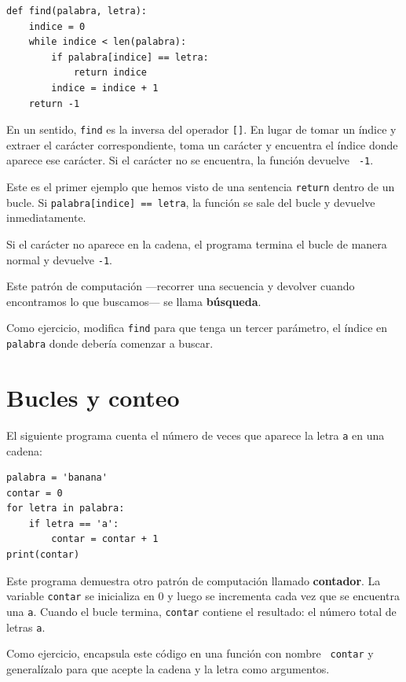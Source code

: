 \documentclass[10pt]{book}
\begin{document}
\begin{verbatim}
def find(palabra, letra):
    indice = 0
    while indice < len(palabra):
        if palabra[indice] == letra:
            return indice
        indice = indice + 1
    return -1
\end{verbatim}
%
En un sentido, {\tt find} es la inversa del operador {\tt []}.
En lugar de tomar un índice y extraer el carácter correspondiente,
toma un carácter y encuentra el índice donde aparece ese
carácter.  Si el carácter no se encuentra, la función devuelve {\tt
-1}.

Este es el primer ejemplo que hemos visto de una sentencia {\tt return}
dentro de un bucle.  Si {\tt palabra[indice] == letra}, la función se sale
del bucle y devuelve inmediatamente.

Si el carácter no aparece en la cadena, el programa
termina el bucle de manera normal y devuelve {\tt -1}.

Este patrón de computación ---recorrer una secuencia y devolver
cuando encontramos lo que buscamos--- se llama {\bf búsqueda}.

Como ejercicio, modifica {\tt find} para que tenga un
tercer parámetro, el índice en {\tt palabra} donde debería comenzar a
buscar.


\section{Bucles y conteo}
\label{counter}

El siguiente programa cuenta el número de veces que aparece la letra {\tt a}
en una cadena:

\begin{verbatim}
palabra = 'banana'
contar = 0
for letra in palabra:
    if letra == 'a':
        contar = contar + 1
print(contar)
\end{verbatim}
%
Este programa demuestra otro patrón de computación llamado {\bf
contador}.  La variable {\tt contar} se inicializa en 0 y luego
se incrementa cada vez que se encuentra una {\tt a}.
Cuando el bucle termina, {\tt contar}
contiene el resultado: el número total de letras {\tt a}.

Como ejercicio, encapsula este código en una función con nombre {\tt
contar} y generalízalo para que acepte la cadena y la
letra como argumentos.
\end{document}

